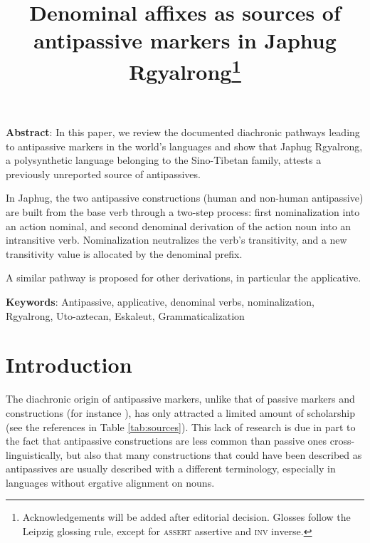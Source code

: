 \documentclass[oldfontcommands,oneside,a4paper,11pt]{article}
\begin{document}
 


\title{Denominal affixes as sources of antipassive markers in Japhug Rgyalrong\footnote{Acknowledgements will be added after editorial decision. Glosses follow the Leipzig glossing rule, except for \textsc{assert}  assertive  and \textsc{inv} inverse. } } 

\maketitle
 \linenumbers

\textbf{Abstract}: In this paper, we review the documented diachronic pathways leading to antipassive markers in the world's languages  and show that Japhug Rgyalrong, a polysynthetic language belonging to the Sino-Tibetan family, attests a previously unreported source of antipassives. 

In Japhug, the two antipassive constructions (human and non-human antipassive) are built from the base verb through a two-step process: first nominalization into an action nominal, and second denominal derivation of the action noun into an intransitive verb. Nominalization neutralizes the verb's   transitivity, and a new transitivity value is allocated by the denominal prefix. 

A similar pathway is proposed for other derivations, in particular the applicative.


\textbf{Keywords}: Antipassive, applicative, denominal verbs, nominalization, Rgyalrong, Uto-aztecan, Eskaleut, Grammaticalization


 \section{Introduction}
 
The diachronic origin of antipassive markers, unlike that of passive markers and constructions (for instance 
\citealt{haspelmath90passive}), has only attracted a limited amount of scholarship (see the references in Table \ref{tab:sources}). This lack of research is due in part to the fact that antipassive constructions are less common than passive ones cross-linguistically, but also that many constructions that could have been described as antipassives are usually described with a different terminology, especially in languages without ergative alignment on nouns.
\end{document}
